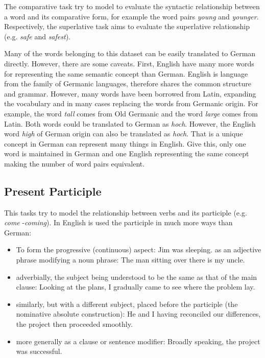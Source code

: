 The comparative task  try to model to evaluate the syntactic relationship between a word
and its comparative form, for example the word pairs  \textit{young} and
\textit{younger}. Respectively, the superlative task aims to evaluate the
superlative relationship  (e.g. \textit{safe}  and \textit{safest}). 

Many of the words belonging to this dataset can be easily translated to
German directly. However, there are some caveats. First, English have many
more words for representing the same semantic concept than German.  English is language from
the family of Germanic languages, therefore shares the common structure
and grammar. However, many words have been borrowed from Latin, expanding the
vocabulary  and in many cases replacing the words from Germanic origin. 
For example, the word \textit{tall}  comes from Old Germanic and  the
word \textit{large} comes from Latin. Both words could be translated to
German as \textit{hoch}. However, the English word  \textit{high} of German
origin can also be translated as \textit{hoch}.
That is a unique concept in German can represent many things in English. 
Give this, only one word is maintained in German and one English representing
the same concept making the number of word pairs equivalent.


%
\subsection{Present Participle}
\label{sec:sub_sec_present_participle}

This tasks try to model the relationship between verbs and its participle
(e.g. \textit{come} -\textit{coming}). In English is used the participle in
much more ways than German: 

\begin{itemize}
\item  To form the progressive (continuous) aspect: Jim was sleeping. as an
  adjective phrase modifying a noun phrase: The man sitting over there is my
  uncle.
\item adverbially, the subject being understood to be the same as that
  of the main clause: Looking at the plans, I gradually came to see where the
  problem lay.
\item  similarly, but with a different subject, placed before the
  participle (the nominative absolute construction): He and I having
  reconciled our differences, the project then proceeded smoothly.
\item more
  generally as a clause or sentence modifier: Broadly speaking, the project
  was successful.

\end{itemize}

